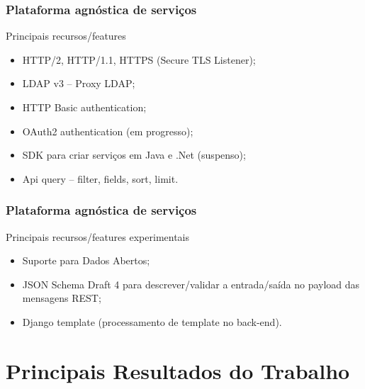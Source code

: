 \documentclass{beamer}
\begin{document}
\begin{frame}
  \frametitle{Plataforma agnóstica de serviços}

  \begin{exampleblock}{Principais recursos/features}
  
	  \begin{itemize}
		\item<1->HTTP/2, HTTP/1.1, HTTPS (Secure TLS Listener);
	    \item<1->LDAP v3 -- Proxy LDAP;
	    \item<1->HTTP Basic authentication;
    	    \item<1->OAuth2 authentication (em progresso);
		\item<1->SDK para criar serviços em Java e .Net (suspenso);
		\item<1->Api query -- filter, fields, sort, limit.
	  \end{itemize}

  \end{exampleblock}

  
\end{frame}


\begin{frame}
  \frametitle{Plataforma agnóstica de serviços}

  \begin{exampleblock}{Principais recursos/features experimentais}
  
	  \begin{itemize}
 	    \item<1->Suporte para Dados Abertos;
    	    \item<1->JSON Schema Draft 4 para descrever/validar a entrada/saída no payload das mensagens REST;
	    \item<1->Django template (processamento de template no back-end).
	  \end{itemize}

  \end{exampleblock}

  
\end{frame}







\section{Principais Resultados do Trabalho}
\end{document}
